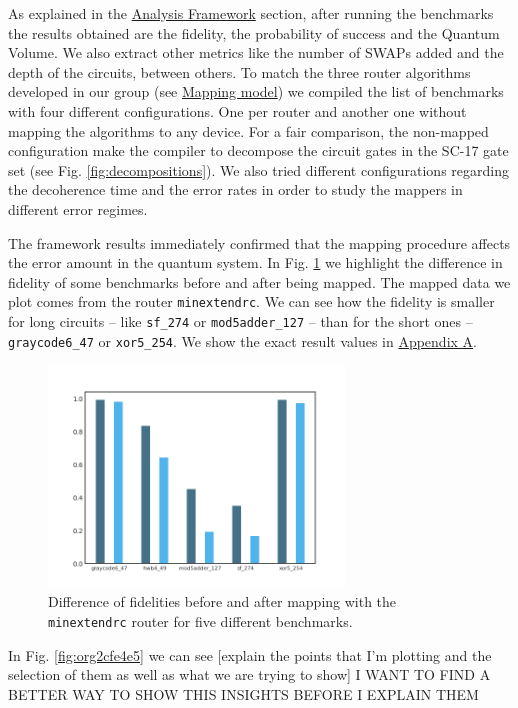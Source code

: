 \label{tab:map_selected_benchs}

As explained in the \href{chapter-4.org}{Analysis Framework} section, after running the benchmarks the results obtained are the fidelity, the probability of success and the Quantum Volume.
We also extract other metrics like the number of SWAPs added and the depth of the circuits, between others.
To match the three router algorithms developed in our group (see \href{chapter-3.org}{Mapping model}) we compiled the list of benchmarks with four different configurations.
One per router and another one without mapping the algorithms to any device.
For a fair comparison, the non-mapped configuration make the compiler to decompose the circuit gates in the SC-17 gate set (see Fig. \ref{fig:decompositions}).
We also tried different configurations regarding the decoherence time and the error rates in order to study the mappers in different error regimes.


The framework results immediately confirmed that the mapping procedure affects the error amount in the quantum system.
In Fig. \ref{fig:org62077d0} we highlight the difference in fidelity of some benchmarks before and after being mapped.
The mapped data we plot comes from the router \texttt{minextendrc}.
We can see how the fidelity is smaller for long circuits -- like \texttt{sf\_274} or \texttt{mod5adder\_127} -- than for the short ones -- \texttt{graycode6\_47} or \texttt{xor5\_254}.
We show the exact result values in \href{appendix-1.org}{Appendix A}.

\begin{figure}[htbp]
\centering
\includegraphics[width=0.7\textwidth]{figures/f_diff_bar_plot.png}
\caption{\label{fig:org62077d0}
Difference of fidelities before and after mapping with the \texttt{minextendrc} router for five different benchmarks.}
\end{figure}
In Fig. \ref{fig:org2cfe4e5} we can see [explain the points that I'm plotting and the selection of them as well as what we are trying to show]
I WANT TO FIND A BETTER WAY TO SHOW THIS INSIGHTS BEFORE I EXPLAIN THEM

